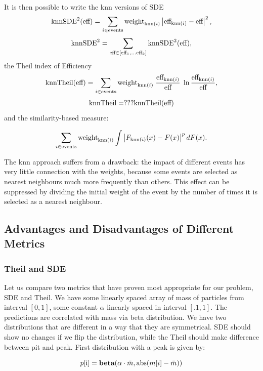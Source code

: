 {It is then possible to write the knn versions of SDE
\[
	\text{knnSDE}^2(\text{eff})
		= \sum_{i \in \text{events}} \text{weight}_{\text{knn}(i)} \left\vert\text{eff}_{\text{knn}(i)} - \text{eff}\right\vert^2,
\]
\[
	\text{knnSDE}^2 = \sum_{\text{eff} \in [\text{eff}_1, \dots \text{eff}_k]}
		\text{knnSDE}^2(\text{eff}),
\]
the Theil index of Efficiency
\[
	\text{knnTheil}(\text{eff}) = \sum_{i \in \text{events}} \text{weight}_{\text{knn}(i)} \; \frac{\text{eff}_{\text{knn}(i)}}{\text{eff}} \; \ln{\frac{\text{eff}_{\text{knn}(i)}}{\text{eff}}},
\]
\[
	\text{knnTheil} = ??? \text{knnTheil}(\text{eff})
\]
and the similarity-based measure:

\[
	 \sum_{i \in \text{events}} \text{weight}_{\text{knn}(i)} \int \left\vert F_{\text{knn}(i)}(x) - F(x)\right\vert^p dF(x).
\]


The knn approach suffers from a drawback: the impact of different events has very little connection with the weights,
because some events are selected as nearest neighbours much more frequently than others.
This effect can be suppressed by dividing the initial weight of the event by the number of times it is selected 
as a nearest neighbour. 

\subsection{Advantages and Disadvantages of Different Metrics}
\subsubsection{Theil and SDE}
Let us compare two metrics that have proven most appropriate for our problem, SDE and Theil. We have some linearly spaced array of mass of particles
from interval $[0,1]$, some constant $\alpha$ linearly spaced in interval $[.1,1]$. The predictions are correlated with mass via beta distribution.
We have two distributions that are different in a way that they are symmetrical. SDE should show no changes if we flip the distribution, while the Theil should make difference between pit and peak. First distribution with a peak is given by:

\[
	p\text{[i]}=\textbf{beta}(\alpha \cdot \bar m, \text{abs}(m\text[i]-\bar m))
\]

}
